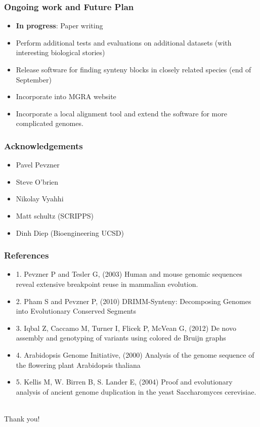 \documentclass[svgnames,14pt]{beamer}
\begin{document}
\begin{frame}
\frametitle{Ongoing work and Future Plan}
\begin{itemize}
    \item \textbf{In progress}: Paper writing
\item Perform additional tests and evaluations on additional datasets (with interesting biological stories)
\item Release software for finding synteny blocks in closely related species (end of September)
\item Incorporate into MGRA website
\item Incorporate a local alignment tool and extend the software for more complicated genomes. 
\end{itemize}
\end{frame}

\begin{frame}
\frametitle{Acknowledgements}
\begin{itemize}
\item Pavel Pevzner
\item Steve O'brien
\item Nikolay Vyahhi 
\item Matt schultz (SCRIPPS)
\item Dinh Diep (Bioengineering UCSD)
\end{itemize}
\end{frame}

\begin{frame}
\frametitle{References}
\begin{itemize}
\item 1. Pevzner P and Tesler G, (2003) Human and mouse genomic sequences reveal extensive breakpoint reuse in mammalian evolution. 
\item 2. Pham S and Pevzner P, (2010) DRIMM-Synteny: Decomposing Genomes into Evolutionary Conserved Segments
\item 3. Iqbal Z, Caccamo M, Turner I, Flicek P, McVean G, (2012) De novo assembly and genotyping of variants using colored de Bruijn graphs
\item 4. Arabidopsis Genome Initiative, (2000) Analysis of the genome sequence of the flowering plant Arabidopsis thaliana
\item 5. Kellis M, W. Birren B, S. Lander E, (2004) Proof and evolutionary analysis of ancient genome duplication in the yeast Saccharomyces cerevisiae.
\end{itemize}
\end{frame}

\begin{center}
\hfill \huge \\
\vspace{60pt}
Thank you!
\end{center}
\end{document}
